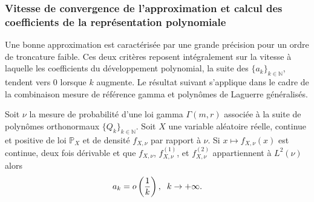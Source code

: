 \subsubsection{Vitesse de convergence de l\rq{}approximation et calcul des coefficients de la représentation polynomiale}
Une bonne approximation est caractérisée par une grande précision pour un ordre de troncature faible. Ces deux critères reposent intégralement sur la vitesse à laquelle les coefficients du développement polynomial, la suite des $\{a_{k}\}_{k\in\mathbb{N}}$, tendent vers $0$ lorsque $k$ augmente. Le résultat suivant s\rq{}applique dans le cadre de la combinaison mesure de référence gamma et polynômes de Laguerre généralisés.
\begin{Prop}\label{OrdreCoefficient}
Soit $\nu$ la mesure de probabilité d\rq{}une loi gamma $\Gamma(m,r)$ associée à la suite de polynômes orthonormaux $\{Q_{k}\}_{k\in\mathbb{N}}$. Soit $X$ une variable aléatoire réelle, continue et positive de loi $\mathbb{P}_{X}$ et de densité $f_{X,\nu}$ par rapport à $\nu$. Si $x\mapsto f_{X,\nu}(x)$ est continue, deux fois dérivable et que $f_{X,\nu}$, $f^{(1)}_{X,\nu}$, et $f^{(2)}_{X,\nu}$ appartiennent à $L^{2}(\nu)$ alors
\begin{equation}\label{SmallOa}
a_{k}=o\left(\frac{1}{k}\right),\hspace{0.2cm}k\rightarrow+\infty.
\end{equation}
\end{Prop}
